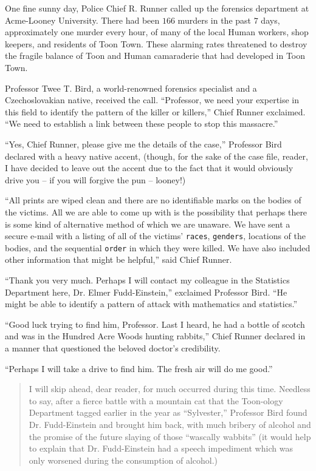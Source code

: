 \documentclass[captions=tableheading]{scrbook}
\begin{document}
\begin{example}
One fine sunny day, Police Chief R. Runner called up the forensics department at Acme-Looney University. There had been \(  166 \) murders in the past \(  7 \) days, approximately one murder every hour, of many of the local Human workers, shop keepers, and residents of Toon Town. These alarming rates threatened to destroy the fragile balance of Toon and Human camaraderie that had developed in Toon Town. 

Professor Twee T. Bird, a world-renowned forensics specialist and a Czechoslovakian native, received the call. “Professor, we need your expertise in this field to identify the pattern of the killer or killers,” Chief Runner exclaimed. “We need to establish a link between these people to stop this massacre.” 

“Yes, Chief Runner, please give me the details of the case,” Professor Bird declared with a heavy native accent, (though, for the sake of the case file, reader, I have decided to leave out the accent due to the fact that it would obviously drive you -- if you will forgive the pun -- looney!) 

“All prints are wiped clean and there are no identifiable marks on the bodies of the victims. All we are able to come up with is the possibility that perhaps there is some kind of alternative method of which we are unaware. We have sent a secure e-mail with a listing of all of the victims’ \texttt{races}, \texttt{genders}, locations of the bodies, and the sequential \texttt{order} in which they were killed. We have also included other information that might be helpful,” said Chief Runner.

“Thank you very much. Perhaps I will contact my colleague in the Statistics Department here, Dr. Elmer Fudd-Einstein,” exclaimed Professor Bird. “He might be able to identify a pattern of attack with mathematics and statistics.”

“Good luck trying to find him, Professor. Last I heard, he had a bottle of scotch and was in the Hundred Acre Woods hunting rabbits,” Chief Runner declared in a manner that questioned the beloved doctor’s credibility. 

“Perhaps I will take a drive to find him. The fresh air will do me good.”

\begin{quote}
I will skip ahead, dear reader, for much occurred during this time. Needless to say, after a fierce battle with a mountain cat that the Toon-ology Department tagged earlier in the year as “Sylvester,” Professor Bird found Dr. Fudd-Einstein and brought him back, with much bribery of alcohol and the promise of the future slaying of those “wascally wabbits” (it would help to explain that Dr. Fudd-Einstein had a speech impediment which was only worsened during the consumption of alcohol.)
\end{quote}


\end{example}
\end{document}
